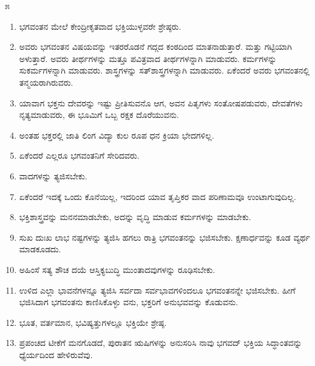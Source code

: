 \begin{center}
೫
\end{center}

\begin{enumerate}
\item ಭಗವಂತನ ಮೇಲೆ ಕೇಂದ್ರೀಕೃತವಾದ ಭಕ್ತಿಯುಳ್ಳವರೇ ಶ್ರೇಷ್ಠರು.

 \item ಅವರು ಭಗವಂತನ ವಿಷಯವನ್ನು ಇತರರೊಡನೆ ಗದ್ಗದ ಕಂಠದಿಂದ ಮಾತನಾಡುತ್ತಾರೆ. ಮತ್ತು ಗಟ್ಟಿಯಾಗಿ ಅಳುತ್ತಾರೆ. ಅವರು ತೀರ್ಥಗಳನ್ನು ಮತ್ತೂ ಪವಿತ್ರವಾದ ತೀರ್ಥಗಳನ್ನಾಗಿ ಮಾಡುವರು. ಕರ್ಮಗಳನ್ನು ಸುಕರ್ಮಗಳನ್ನಾಗಿ ಮಾಡುವರು. ಶಾಸ್ತ್ರಗಳನ್ನು ಸತ್​ಶಾಸ್ತ್ರಗಳನ್ನಾಗಿ ಮಾಡುವರು. ಏಕೆಂದರೆ ಅವರು ಭಗವಂತನಲ್ಲಿ ತನ್ಮಯರಾಗಿರುವರು.

 \item ಯಾವಾಗ ಭಕ್ತನು ದೇವರನ್ನು ಇಷ್ಟು ಪ್ರೀತಿಸುವನೊ ಆಗ, ಅವನ ಪಿತೃಗಳು ಸಂತೋಷಪಡುವರು, ದೇವತೆಗಳು ನೃತ್ಯಮಾಡುವರು, ಈ ಭೂಮಿಗೆ ಒಬ್ಬ ರಕ್ಷಕ ದೊರೆಯುವನು.

 \item ಅಂತಹ ಭಕ್ತರಲ್ಲಿ ಜಾತಿ ಲಿಂಗ ವಿದ್ಯಾ ಕುಲ ರೂಪ ಧನ ಕ್ರಿಯಾ ಭೇದಗಳಿಲ್ಲ.

 \item ಏಕೆಂದರೆ ಎಲ್ಲರೂ ಭಗವಂತನಿಗೆ ಸೇರಿದವರು.

 \item ವಾದಗಳನ್ನು ತ್ಯಜಿಸಬೇಕು.

 \item ಏಕೆಂದರೆ ಇದಕ್ಕೆ ಒಂದು ಕೊನೆಯಿಲ್ಲ, ಇದರಿಂದ ಯಾವ ತೃಪ್ತಿಕರ ವಾದ ಪರಿಣಾಮವೂ ಉಂಟಾಗುವುದಿಲ್ಲ.

 \item ಭಕ್ತಿಶಾಸ್ತ್ರವನ್ನು ಮನನಮಾಡಬೇಕು, ಅದನ್ನು ವೃದ್ಧಿ ಮಾಡುವ ಕರ್ಮಗಳನ್ನು ಮಾಡಬೇಕು.

 \item ಸುಖ ದುಃಖ ಲಾಭ ನಷ್ಟಗಳನ್ನು ತ್ಯಜಿಸಿ ಹಗಲು ರಾತ್ರಿ ಭಗವಂತನನ್ನು ಭಜಿಸಬೇಕು. ಕ್ಷಣಾರ್ಧವನ್ನು ಕೂಡ ವ್ಯರ್ಥ ಮಾಡಕೂಡದು.

 \item ಅಹಿಂಸೆ ಸತ್ಯ ಶೌಚ ದಯೆ ಆಸ್ತಿಕ್ಯಬುದ್ಧಿ ಮುಂತಾದವುಗಳನ್ನು ರೂಢಿಸಬೇಕು.

 \item ಉಳಿದ ಎಲ್ಲಾ ಭಾವನೆಗಳನ್ನೂ ತ್ಯಜಿಸಿ ಸರ್ವದಾ ಸರ್ವಭಾವಗಳಿಂದಲೂ ಭಗವಂತನನ್ನೇ ಭಜಿಸಬೇಕು. ಹೀಗೆ ಭಜಿಸಿದಾಗ ಭಗವಂತನು ಕಾಣಿಸಿಕೊಳ್ಳು ವನು, ಭಕ್ತರಿಗೆ ಅನುಭವವನ್ನು ಕೊಡುವನು.

 \item ಭೂತ, ವರ್ತಮಾನ, ಭವಿಷ್ಯತ್ತುಗಳಲ್ಲೂ ಭಕ್ತಿಯೇ ಶ್ರೇಷ್ಠ.

 \item ಪ್ರಪಂಚದ ಟೀಕೆಗೆ ಮನಗೊಡದೆ, ಪುರಾತನ ಋಷಿಗಳನ್ನು ಅನುಸರಿಸಿ ನಾವು ಭಗವದ್​ ಭಕ್ತಿಯ ಸಿದ್ಧಾಂತವನ್ನು ಧ್ಯೆರ್ಯದಿಂದ ಹೇಳಿರುವೆವು.

\end{enumerate}

